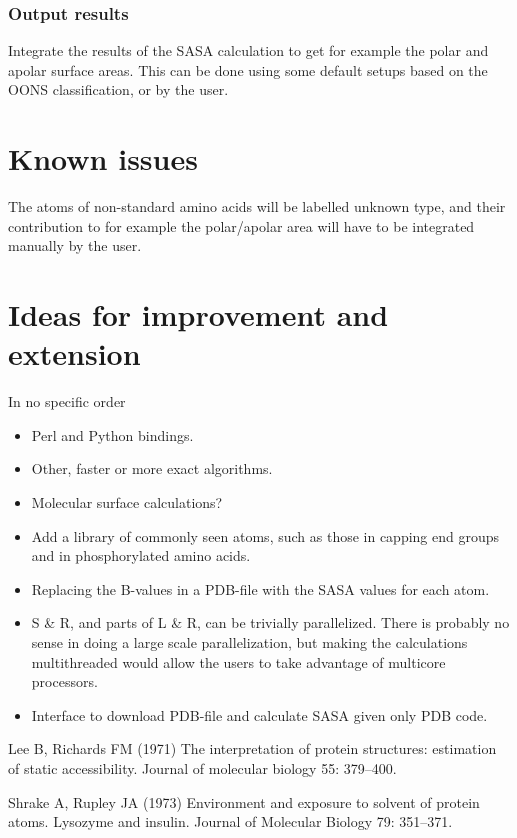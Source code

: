 \documentclass[a4paper,11pt]{article}
\begin{document}
\subsubsection{Output results}
Integrate the results of the SASA calculation to get for example the
polar and apolar surface areas. This can be done using some default
setups based on the OONS classification, or by the user.

\section{Known issues}

The atoms of non-standard amino acids will be labelled unknown type,
and their contribution to for example the polar/apolar area will have
to be integrated manually by the user.

\section{Ideas for improvement and extension}

In no specific order
\begin{itemize}
\item Perl and Python bindings.
\item Other, faster or more exact algorithms.
\item Molecular surface calculations?
\item Add a library of commonly seen atoms, such as those in capping
  end groups and in phosphorylated amino acids.
\item Replacing the B-values in a PDB-file with the SASA values for
  each atom.
\item S \& R, and parts of L \& R, can be trivially
  parallelized. There is probably no sense in doing a large scale
  parallelization, but making the calculations multithreaded would
  allow the users to take advantage of multicore processors.
\item Interface to download PDB-file and calculate SASA given only PDB
  code.
\end{itemize}

\begin{thebibliography}{50}

  Lee B, Richards FM (1971) The interpretation of protein structures: estimation of static accessibility. Journal of molecular biology 55: 379–400.

  Shrake A, Rupley JA (1973) Environment and exposure to solvent of protein atoms. Lysozyme and insulin. Journal of Molecular Biology 79: 351–371.
\end{thebibliography}
\end{document}

